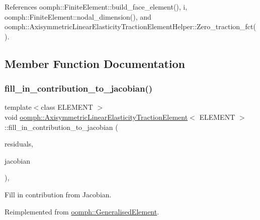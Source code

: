 References oomph\+::\+Finite\+Element\+::build\+\_\+face\+\_\+element(), i, oomph\+::\+Finite\+Element\+::nodal\+\_\+dimension(), and oomph\+::\+Axisymmetric\+Linear\+Elasticity\+Traction\+Element\+Helper\+::\+Zero\+\_\+traction\+\_\+fct().



\subsection{Member Function Documentation}
\mbox{\label{classoomph_1_1AxisymmetricLinearElasticityTractionElement_a2a94d08c2f96f71ecd6edcfdfbceb4ab}} 
\subsubsection{\texorpdfstring{fill\+\_\+in\+\_\+contribution\+\_\+to\+\_\+jacobian()}{fill\_in\_contribution\_to\_jacobian()}}
{\footnotesize\ttfamily template$<$class E\+L\+E\+M\+E\+NT $>$ \\
void \hyperlink{classoomph_1_1AxisymmetricLinearElasticityTractionElement}{oomph\+::\+Axisymmetric\+Linear\+Elasticity\+Traction\+Element}$<$ E\+L\+E\+M\+E\+NT $>$\+::fill\+\_\+in\+\_\+contribution\+\_\+to\+\_\+jacobian (\begin{DoxyParamCaption}\item[{\hyperlink{classoomph_1_1Vector}{Vector}$<$ double $>$ \&}]{residuals,  }\item[{\hyperlink{classoomph_1_1DenseMatrix}{Dense\+Matrix}$<$ double $>$ \&}]{jacobian }\end{DoxyParamCaption})\hspace{0.3cm}{\ttfamily [inline]}, {\ttfamily [virtual]}}



Fill in contribution from Jacobian. 



Reimplemented from \hyperlink{classoomph_1_1GeneralisedElement_a6ae09fc0d68e4309ac1b03583d252845}{oomph\+::\+Generalised\+Element}.



